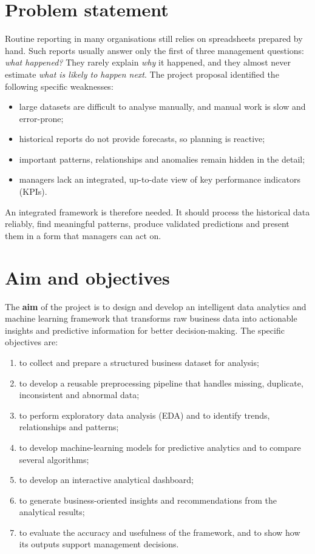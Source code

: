 \section{Problem statement}
Routine reporting in many organisations still relies on spreadsheets prepared by hand. Such reports usually
answer only the first of three management questions: \emph{what happened?} They rarely explain \emph{why} it
happened, and they almost never estimate \emph{what is likely to happen next}. The project proposal identified
the following specific weaknesses:
\begin{itemize}
  \item large datasets are difficult to analyse manually, and manual work is slow and error-prone;
  \item historical reports do not provide forecasts, so planning is reactive;
  \item important patterns, relationships and anomalies remain hidden in the detail;
  \item managers lack an integrated, up-to-date view of key performance indicators (KPIs).
\end{itemize}
An integrated framework is therefore needed. It should process the historical data reliably, find meaningful
patterns, produce validated predictions and present them in a form that managers can act on.

\section{Aim and objectives}
The \textbf{aim} of the project is to design and develop an intelligent data analytics and machine learning
framework that transforms raw business data into actionable insights and predictive information for better
decision-making. The specific objectives are:
\begin{enumerate}[label=O\arabic*.]
  \item to collect and prepare a structured business dataset for analysis;
  \item to develop a reusable preprocessing pipeline that handles missing, duplicate, inconsistent and abnormal data;
  \item to perform exploratory data analysis (EDA) and to identify trends, relationships and patterns;
  \item to develop machine-learning models for predictive analytics and to compare several algorithms;
  \item to develop an interactive analytical dashboard;
  \item to generate business-oriented insights and recommendations from the analytical results;
  \item to evaluate the accuracy and usefulness of the framework, and to show how its outputs support management decisions.
\end{enumerate}

